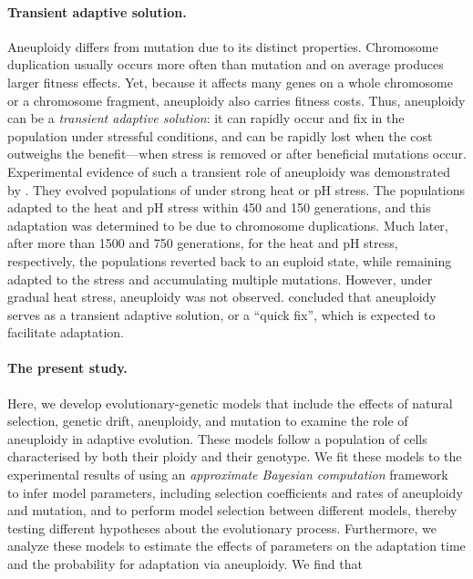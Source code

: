 \documentclass[12pt]{extarticle}
\begin{document}
\paragraph*{Transient adaptive solution.} 
Aneuploidy differs from mutation due to its distinct properties. 
Chromosome duplication usually occurs more often than mutation and on average produces larger fitness effects.
Yet, because it affects many genes on a whole chromosome or a chromosome fragment, aneuploidy also carries fitness costs.
Thus, aneuploidy can be a \emph{transient adaptive solution}: it can rapidly occur and fix in the population under stressful conditions, and can be rapidly lost when the cost outweighs the benefit---when stress is removed or after beneficial mutations occur.
Experimental evidence of such a transient role of aneuploidy was demonstrated by \citet{Yona2012}. They evolved populations of \yeast under strong heat or pH stress.
The populations adapted to the heat and pH stress within 450 and 150 generations, and this adaptation was determined to be due to chromosome duplications.
Much later, after more than 1500 and 750 generations, for the heat and pH stress, respectively, the populations reverted back to an euploid state, while remaining adapted to the stress and accumulating multiple mutations.
However, under gradual heat stress, aneuploidy was not observed.
\citet{Yona2012} concluded that aneuploidy serves as a transient adaptive solution, or a ``quick fix'', which is expected to facilitate adaptation. 

\paragraph*{The present study.}
Here, we develop evolutionary-genetic models that include the effects of natural selection, genetic drift, aneuploidy, and mutation to examine the role of aneuploidy in adaptive evolution.
These models follow a population of cells characterised by both their ploidy and their genotype.
We fit these models to the experimental results of \citet{Yona2012} using an \emph{approximate Bayesian computation} framework~\citep{Sisson2009, Klinger2018} to infer model parameters, including selection coefficients and rates of aneuploidy and mutation, and to perform model selection between different models, thereby testing different hypotheses about the evolutionary process.
Furthermore, we analyze these models to estimate the effects of parameters on the adaptation time and the probability for adaptation via aneuploidy.
We find that %
\end{document}
